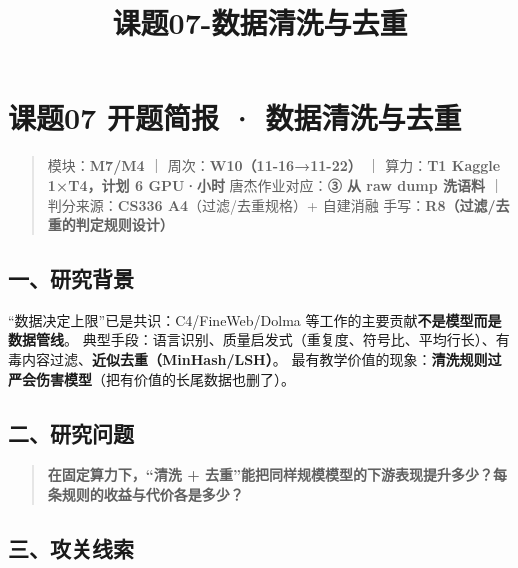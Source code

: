 \documentclass[
  chinese,
  11pt,
]{ctexart}
\title{课题07-数据清洗与去重}
\author{}
\date{}
\begin{document}
\maketitle

{
\setcounter{tocdepth}{2}
\tableofcontents
}
\section{课题07 开题简报 · 数据清洗与去重}\label{ux8bfeux989807-ux5f00ux9898ux7b80ux62a5-ux6570ux636eux6e05ux6d17ux4e0eux53bbux91cd}

\begin{quote}
模块：\textbf{M7/M4} ｜ 周次：\textbf{W10（11-16→11-22）} ｜ 算力：\textbf{T1 Kaggle 1×T4，计划 6 GPU·小时} 唐杰作业对应：\textbf{③ 从 raw dump 洗语料} ｜ 判分来源：\textbf{CS336 A4}（过滤/去重规格）+ 自建消融 手写：\textbf{R8（过滤/去重的判定规则设计）}
\end{quote}

\subsection{一、研究背景}\label{ux4e00ux7814ux7a76ux80ccux666f}

``数据决定上限''已是共识：C4/FineWeb/Dolma 等工作的主要贡献\textbf{不是模型而是数据管线}。 典型手段：语言识别、质量启发式（重复度、符号比、平均行长）、有毒内容过滤、\textbf{近似去重（MinHash/LSH）}。 最有教学价值的现象：\textbf{清洗规则过严会伤害模型}（把有价值的长尾数据也删了）。

\subsection{二、研究问题}\label{ux4e8cux7814ux7a76ux95eeux9898}

\begin{quote}
\textbf{在固定算力下，``清洗 + 去重''能把同样规模模型的下游表现提升多少？每条规则的收益与代价各是多少？}
\end{quote}

\subsection{三、攻关线索}\label{ux4e09ux653bux5173ux7ebfux7d22}
\end{document}
